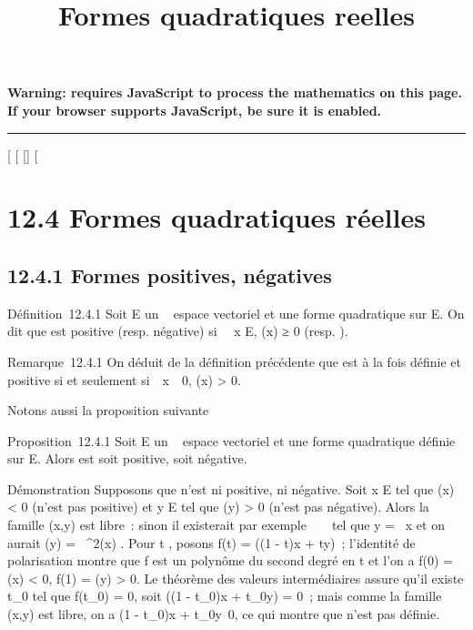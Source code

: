 \documentclass[]{article}
\title{Formes quadratiques reelles}
\author{}
\date{}
\begin{document}
\maketitle

\textbf{Warning: 
requires JavaScript to process the mathematics on this page.\\ If your
browser supports JavaScript, be sure it is enabled.}

\begin{center}\rule{3in}{0.4pt}\end{center}

[
[
[]
[

\section{12.4 Formes quadratiques réelles}

\subsection{12.4.1 Formes positives, négatives}

Définition~12.4.1 Soit E un ~ espace vectoriel et \Phi une forme
quadratique sur E. On dit que \Phi est positive (resp. négative) si
\forall~~x \in E, \Phi(x) ≥ 0 (resp. ).

Remarque~12.4.1 On déduit de la définition précédente que \Phi est à la
fois définie et positive si et seulement
si~\forall~x\mathrel\neq~~0, \Phi(x)
> 0.

Notons aussi la proposition suivante

Proposition~12.4.1 Soit E un ~ espace vectoriel et \Phi une forme
quadratique définie sur E. Alors \Phi est soit positive, soit négative.

Démonstration Supposons que \Phi n'est ni positive, ni négative. Soit x \in E
tel que \Phi(x) < 0 (\Phi n'est pas positive) et y \in E tel que \Phi(y)
> 0 (\Phi n'est pas négative). Alors la famille (x,y) est
libre~: sinon il existerait par exemple \lambda~ \in {}~ tel que y = \lambda~x et on
aurait \Phi(y) = \lambda~^2\Phi(x) . Pour t \in [0,1], posons f(t) =
\Phi((1 - t)x + ty)~; l'identité de polarisation montre que f est un
polynôme du second degré en t et l'on a f(0) = \Phi(x) < 0, f(1)
= \Phi(y) > 0. Le théorème des valeurs intermédiaires assure
qu'il existe t_0 \in [0,1] tel que f(t_0) = 0, soit
\Phi((1 - t_0)x + t_0y) = 0~; mais comme la famille (x,y)
est libre, on a (1 - t_0)x +
t_0y\neq~0, ce qui montre que \Phi n'est
pas définie.
\end{document}
